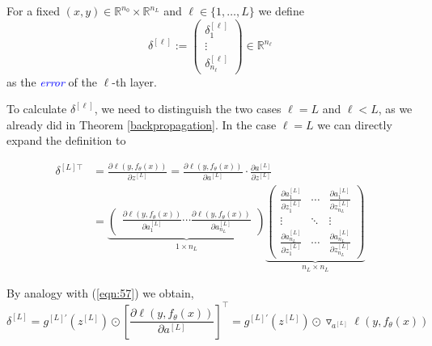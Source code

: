 \begin{definition}[Error]
For a fixed $(x, y) \in \mathbb{R}^{n_0} \times \mathbb{R}^{n_L}$ and $\ell \in \{1, \ldots, L\}$ we define
\begin{equation}
    \delta^{[\ell]} := \begin{pmatrix}
        \delta_1^{[\ell]} \\ \vdots \\ \delta_{n_{\ell}}^{[\ell]}
    \end{pmatrix} \in \mathbb{R}^{n_{\ell}}
    \label{eqn:58}
\end{equation}
as the \textcolor{blue}{\emph{error}} of the $\ell$-th layer.
\end{definition}

To calculate $\delta^{[\ell]}$, we need to distinguish the two cases $\ell = L$ and $\ell < L$, as we already did in Theorem \ref{backpropagation}. In the case $\ell = L$ we can directly expand the definition to

\begin{equation}
    \begin{aligned}
    \delta^{[L]\top} &= \frac{\partial \ell(y, f_\theta(x))}{\partial z^{[L]}} = \frac{\partial \ell(y, f_\theta(x))}{\partial a^{[L]}} \cdot \frac{\partial a^{[L]}}{\partial z^{[L]}}\\
    &= \underbrace{\begin{pmatrix}
        \frac{\partial \ell(y, f_\theta(x))}{\partial a_1^{[L]}} \cdots \frac{\partial \ell(y, f_\theta(x))}{\partial a_{n_L}^{[L]}}
    \end{pmatrix}}_{1 \times n_L} \underbrace{\begin{pmatrix}
        \frac{\partial a_1^{[L]}}{\partial z_1^{[L]}} & \cdots & \frac{\partial a_1^{[L]}}{\partial z_{n_L}^{[L]}}\\
        \vdots & \ddots & \vdots\\
        \frac{\partial a_{n_L}^{[L]}}{\partial z_1^{[L]}} & \cdots & \frac{\partial a_{n_L}^{[L]}}{\partial z_{n_L}^{[L]}}
    \end{pmatrix}}_{n_L \times n_L}
    \end{aligned}
    \label{eqn:59}
\end{equation}

By analogy with (\ref{eqn:57}) we obtain,
\begin{equation}
    \delta^{[L]} = g^{[L]'} \left( z^{[L]} \right) \odot \left[ \frac{\partial \ell (y, f_\theta(x))}{\partial a^{[L]}}  \right]^\top = g^{[L]'} \left( z^{[L]} \right) \odot \triangledown_{a^{[L]}} \ell(y, f_\theta(x))
    \label{eqn:60}
\end{equation}

